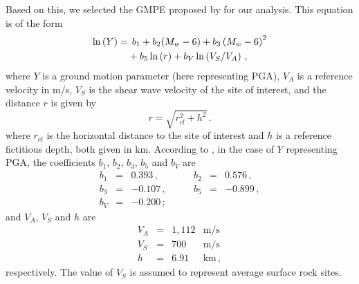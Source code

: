 Based on this, we selected the GMPE proposed by \citet{Kalkan2004} for our analysis. This equation is of the form
% 
\begin{align}
	\ln \left( Y \right) =
		& \hspace{1ex} b_1 + b_2(M_w - 6) + b_3 \left( M_w - 6 \right)^{2} \nonumber \\ 
		& + b_5 \ln \left( r \right) + b_V \ln \left( V_S / V_A \right)
	\, ,
\end{align}
% 
where $Y$ is a ground motion parameter (here representing PGA), $V_A$ is a reference velocity in m/s, $V_S$ is the shear wave velocity of the site of interest, and the distance $r$ is given by
% 
\begin{equation}
	r= \sqrt{ r^2_{\mathit{cl}} + h^2 }
	\, .
\end{equation}
% 
where $r_{\mathit{cl}}$ is the horizontal distance to the site of interest and $h$ is a reference fictitious depth, both given in km. According to \citet{Kalkan2004}, in the case of $Y$ representing PGA, the coefficients $b_1$, $b_2$, $b_3$, $b_5$ and $b_V$ are
% 
\begin{equation}
\begin{array}{lcrlcr} 
	b_1 &=&  0.393   \,,&\hspace{2em}   b_2 &=& 0.576\,,   \\
	b_3 &=& -0.107   \,,&\hspace{2em}   b_5 &=& -0.899\,,  \\
	b_V &=& -0.200   \,; 
	\nonumber
\end{array}
\end{equation}
% 
and $V_A$, $V_S$ and $h$ are
% 
\begin{equation}
\begin{array}{lcrl} 
	V_A &=& 1,112 & \mathrm{m/s}	\\
	V_S &=&   700 & \mathrm{m/s}	\\
	h   &=&  6.91 & \mathrm{km}\,,
	\nonumber
\end{array}
\end{equation}
% 
respectively. The value of $V_S$ is assumed to represent average surface rock sites.




